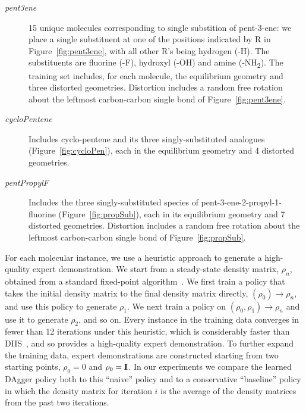 \documentclass[twoside,11pt]{article}
\begin{document}
\begin{description}
\item[\textit{pent3ene}] 15 unique molecules corresponding to single substition of pent-3-ene: we place a single substituent at one of the positions indicated by R in Figure~\ref{fig:pent3ene}, with all other R's being hydrogen (-H). The substituents are fluorine (-F), hydroxyl (-OH) and amine (-NH\textsubscript{2}). The training set includes, for each molecule, the equilibrium geometry and three distorted geometries. Distortion includes a random free rotation about the leftmost carbon-carbon single bond of Figure~\ref{fig:pent3ene}. 
\item[\textit{cycloPentene}]Includes cyclo-pentene and its three singly-substituted analogues (Figure~\ref{fig:cycloPen}), each in the equilibrium geometry and 4 distorted geometries. 
\item[\textit{pentPropylF}] Includes the three singly-substituted species of pent-3-ene-2-propyl-1-fluorine (Figure~\ref{fig:propSub}), each in its equilibrium geometry and 7 distorted geometries. Distortion includes a random free rotation about the leftmost carbon-carbon single bond of Figure~\ref{fig:propSub}. 
\end{description}

For each molecular instance, we use a heuristic approach to generate a high-quality expert demonstration.  We start from a steady-state density matrix, $\rho_n$, obtained from a standard fixed-point algorithm~\citep{Pulay1980}.  We first train a policy that takes the initial density matrix to the final density matrix directly, $(\rho_0) \rightarrow \rho_n$, and use this policy to generate $\rho_1$.  We next train a policy on $(\rho_0, \rho_1) \rightarrow \rho_n$ and use it to generate $\rho_2$, and so on.  Every instance in the training data converges in fewer than 12 iterations under this heuristic, which is considerably faster than DIIS~\citep{Pulay1980}, and so provides a high-quality expert demonstration. To further expand the training data, expert demonstrations are constructed starting from two starting points, $\rho_0 = 0$ and $\rho_0 = {\bf I}$.  In our experiments we compare the learned DAgger policy both to this ``naive'' policy and to a conservative ``baseline'' policy in which the density matrix for iteration $i$ is the average of the density matrices from the past two iterations.
\end{document}
